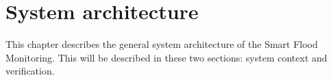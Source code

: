 \chapter{System architecture}
\label{ch:system}
This chapter describes the general system architecture of the Smart Flood Monitoring. This will be described in these two sections: system context and verification.



% 

